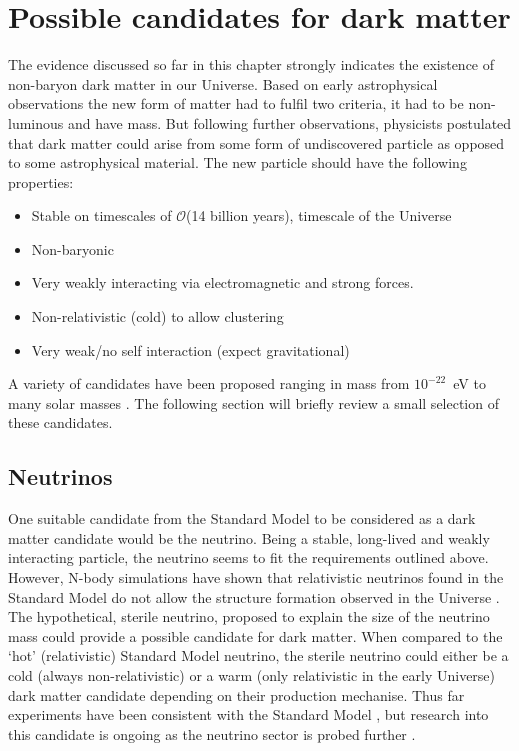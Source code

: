 \section{Possible candidates for dark matter}\label{sec:DMOverview/Candidates4DM}
The evidence discussed so far in this chapter strongly indicates the existence of non-baryon dark matter in our Universe. Based on early astrophysical observations the new form of matter had to fulfil two criteria, it had to be non-luminous and have mass. But following further observations, physicists postulated that dark matter could arise from some form of undiscovered particle as opposed to some astrophysical material. The new particle should have the following properties:
\begin{itemize}
    \item Stable on timescales of $\mathcal{O}$(14 billion years), timescale of the Universe
    \item Non-baryonic
    \item Very weakly interacting via electromagnetic and strong forces.
    \item Non-relativistic (cold) to allow clustering
    \item Very weak/no self interaction (expect gravitational)
\end{itemize}
A variety of candidates have been proposed ranging in mass from $10^{-22}$~eV to many solar masses \cite{DMPrimer}. The following section will briefly review a small selection of these candidates.
\subsection{Neutrinos}\label{sec:DMOverview/Neutrinos}
One suitable candidate from the Standard Model to be considered as a dark matter candidate would be the neutrino. Being a stable, long-lived and weakly interacting particle, the neutrino seems to fit the requirements outlined above. However, N-body simulations have shown that relativistic neutrinos found in the Standard Model do not allow the structure formation observed in the Universe \cite{White:1983fcs}. The hypothetical, sterile neutrino, proposed to explain the size of the neutrino mass could provide a possible candidate for dark matter. When compared to the `hot' (relativistic) Standard Model neutrino, the sterile neutrino could either be a cold (always non-relativistic) or a warm (only relativistic in the early Universe) dark matter candidate depending on their production mechanise. Thus far experiments have been consistent with the Standard Model \cite{Boyarsky:2018tvu}, but research into this candidate is ongoing as the neutrino sector is probed further \cite{Krasnov:2019kdc}.
